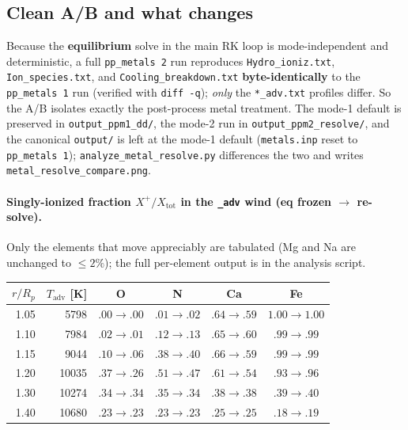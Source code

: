 \documentclass[english,a4paper]{kiseon_memo}
\begin{document}
\subsection{Clean A/B and what changes}
Because the \textbf{equilibrium} solve in the main RK loop is mode-independent and
deterministic, a full \texttt{pp\_metals 2} run reproduces
\texttt{Hydro\_ioniz.txt}, \texttt{Ion\_species.txt}, and
\texttt{Cooling\_breakdown.txt} \textbf{byte-identically} to the
\texttt{pp\_metals 1} run (verified with \texttt{diff -q}); \emph{only} the
\texttt{*\_adv.txt} profiles differ. So the A/B isolates exactly the post-process
metal treatment. The mode-1 default is preserved in \texttt{output\_ppm1\_dd/},
the mode-2 run in \texttt{output\_ppm2\_resolve/}, and the canonical
\texttt{output/} is left at the mode-1 default (\texttt{metals.inp} reset to
\texttt{pp\_metals 1}); \texttt{analyze\_metal\_resolve.py} differences the two
and writes \texttt{metal\_resolve\_compare.png}.

\paragraph{Singly-ionized fraction \(X^+/X_{\mathrm{tot}}\) in the \texttt{\_adv}
wind (eq frozen \(\to\) re-solve).} Only the elements that move appreciably are
tabulated (Mg and Na are unchanged to \(\le 2\%\)); the full per-element output is
in the analysis script.

\begin{center}
\small
\begin{tabular}{rrcccc}
\hline
\(r/R_p\) & \(T_{\mathrm{adv}}\) [K] & O & N & Ca & Fe \\
\hline
1.05 &  5798 & \(.00{\to}.00\) & \(.01{\to}.02\) & \(.64{\to}.59\) & \(1.00{\to}1.00\) \\
1.10 &  7984 & \(.02{\to}.01\) & \(.12{\to}.13\) & \(.65{\to}.60\) & \(.99{\to}.99\) \\
1.15 &  9044 & \(.10{\to}.06\) & \(.38{\to}.40\) & \(.66{\to}.59\) & \(.99{\to}.99\) \\
1.20 & 10035 & \(.37{\to}.26\) & \(.51{\to}.47\) & \(.61{\to}.54\) & \(.93{\to}.96\) \\
1.30 & 10274 & \(.34{\to}.34\) & \(.35{\to}.34\) & \(.38{\to}.38\) & \(.39{\to}.40\) \\
1.40 & 10680 & \(.23{\to}.23\) & \(.23{\to}.23\) & \(.25{\to}.25\) & \(.18{\to}.19\) \\
\hline
\end{tabular}
\end{center}
\end{document}
